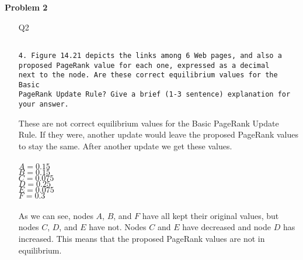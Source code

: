 \documentclass[ruled]{article}
\begin{document}
\textbf{Problem 2}
\begin{itemize}
\item[Q2]
\begin{verbatim}

4. Figure 14.21 depicts the links among 6 Web pages, and also a
proposed PageRank value for each one, expressed as a decimal
next to the node. Are these correct equilibrium values for the Basic
PageRank Update Rule? Give a brief (1-3 sentence) explanation for
your answer.

\end{verbatim}
These are not correct equilibrium values for the Basic PageRank Update Rule.  If they were, another update would leave the proposed PageRank values to stay the same.  After another update we get these values.
\\ \\
{\Large 
$A = 0.15$ \\
$B = 0.15$ \\
$C = 0.075$ \\
$D = 0.25$ \\
$E = 0.075$ \\
$F = 0.3$ \\
}
\\
As we can see, nodes $A$, $B$, and $F$ have all kept their original values, but nodes $C$, $D$, and $E$ have not.  Nodes $C$ and $E$ have decreased and node $D$ has increased.   This means that the proposed PageRank values are not in equilibrium.\\
\end{itemize}
\end{document}
